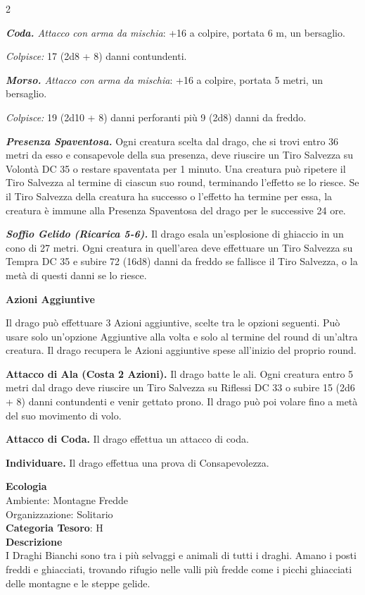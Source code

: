 \begin{multicols}{2}
{\emph{\textbf{Coda.} Attacco con arma da mischia}: +16 a colpire, portata 6 m, un bersaglio.

\emph{Colpisce:} 17 (2d8 + 8) danni contundenti.

\emph{\textbf{Morso.} Attacco con arma da mischia}: +16 a colpire, portata 5 metri, un bersaglio.

\emph{Colpisce:} 19 (2d10 + 8) danni perforanti più 9 (2d8) danni da freddo.

\emph{\textbf{Presenza Spaventosa.}} Ogni creatura scelta dal drago, che si trovi entro 36 metri da esso e consapevole della sua presenza, deve riuscire un Tiro Salvezza su Volontà DC 35 o restare spaventata per 1 minuto. Una creatura può ripetere il Tiro Salvezza al termine di ciascun suo round, terminando l'effetto se lo riesce. Se il Tiro Salvezza della creatura ha successo o l'effetto ha termine per essa, la creatura è immune alla Presenza Spaventosa del drago per le successive 24 ore.

\emph{\textbf{Soffio Gelido (Ricarica 5-6).}} Il drago esala un'esplosione di ghiaccio in un cono di 27 metri. Ogni creatura in quell'area deve effettuare un Tiro Salvezza su Tempra DC 35 e subire 72 (16d8) danni da freddo se fallisce il Tiro Salvezza, o la metà di questi danni se lo riesce.

\textbf{Azioni Aggiuntive}

Il drago può effettuare 3 Azioni aggiuntive, scelte tra le opzioni seguenti. Può usare solo un'opzione Aggiuntive alla volta e solo al termine del round di un'altra creatura. Il drago recupera le Azioni aggiuntive spese all'inizio del proprio round.

\textbf{Attacco di Ala (Costa 2 Azioni).} Il drago batte le ali. Ogni creatura entro 5 metri dal drago deve riuscire un Tiro Salvezza su Riflessi DC 33 o subire 15 (2d6 + 8) danni contundenti e venir gettato prono. Il drago può poi volare fino a metà del suo movimento di volo.

\textbf{Attacco di Coda.} Il drago effettua un attacco di coda.

\textbf{Individuare.} Il drago effettua una prova di Consapevolezza.

\textbf{Ecologia}\\
Ambiente: Montagne Fredde\\
Organizzazione: Solitario\\
\textbf{Categoria Tesoro}: H\\
\textbf{Descrizione}\\
I Draghi Bianchi sono tra i più selvaggi e animali di tutti i draghi.
Amano i posti freddi e ghiacciati, trovando rifugio nelle valli più fredde come i picchi ghiacciati delle montagne e le steppe gelide.

}
\end{multicols}
